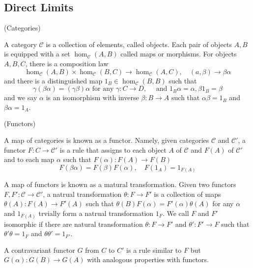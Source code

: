 \documentclass{article}
\begin{document}
\subsection{Direct Limits}

\begin{definition}
    (Categories)\par
    A category $\mathcal{C}$ is a collection of elements, called objects. Each pair of objects $A,B$ is equipped with a set $\hom_{\mathcal{C}}(A,B)$ called maps or morphisms. For objects $A,B,C$, there is a composition law
    \[\hom_{\mathcal{C}}(A,B) \times \hom_{\mathcal{C}}(B,C) \to \hom_{\mathcal{C}}(A,C),\quad (a,\beta) \to \beta\alpha\]
    and there is a distinguished map $1_B \in \hom_{\mathcal{C}}(B,B)$ such that
    \[
    \gamma(\beta\alpha) = (\gamma\beta)\alpha\text{ for any }\gamma:C\to D,\quad\text{ and }1_B\alpha= \alpha, \beta 1_B = \beta
    \]
    and we say $\alpha$ is an isomorphism with inverse $\beta:B\to A$ such that $\alpha\beta = 1_B$ and $\beta\alpha = 1_A$.
\end{definition}

\begin{definition}
    (Functors)\par A map of categories is known as a functor. Namely, given categories $\mathcal{C}$ and $\mathcal{C}'$, a functor $F:C\to \mathcal{C}'$ is a rule that assigns to each object $A$ of $\mathcal{C}$ and $F(A)$ of $\mathcal{C}'$ and to each map $\alpha$ such that $F(\alpha):F(A)\to F(B)$
    \[
    F(\beta\alpha) = F(\beta)F(\alpha),\quad F(1_A) = 1_{F(A)}
    \]\par
    A map of functors is known as a matural transformation. Given two functors $F,F':\mathcal{C} \to \mathcal{C}'$, a natrual transformation $\theta:F\to F'$ is a collection of maps $\theta(A):F(A) \to F'(A)$ such that $\theta(B)F(\alpha) = F'(\alpha)\theta(A)$ for any $\alpha$ and $1_{F(A)}$ trvially form a natrual transformation $1_F$. We call $F$ and $F'$ isomorphic if there are natural transformation $\theta:F\to F'$ and $\theta' : F'\to F$ such that $\theta'\theta = 1_F$ and $\theta\theta' = 1_{F'}$.\par
    A contravariant functor $G$ from $C$ to $C'$ is a rule similar to $F$ but $G(\alpha):G(B)\to G(A)$ with analogous properties with functors.
\end{definition}
\end{document}
